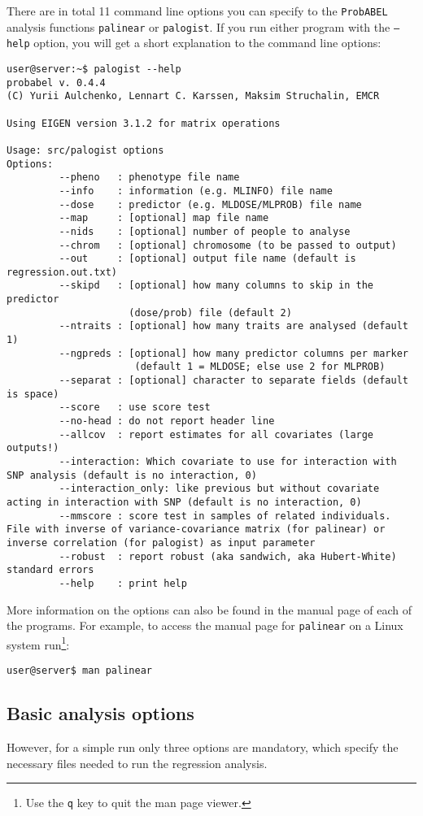 \documentclass[12pt,a4paper]{article}
\newcommand{\PA}{\texttt{ProbABEL}}
\begin{document}
There are in total 11 command line options you can specify to the
\PA{} analysis functions \texttt{palinear} or \texttt{palogist}. If
you run either program with the \texttt{--help} option, you will get a
short explanation to the command line options:
\begin{verbatim}
user@server:~$ palogist --help
probabel v. 0.4.4
(C) Yurii Aulchenko, Lennart C. Karssen, Maksim Struchalin, EMCR

Using EIGEN version 3.1.2 for matrix operations

Usage: src/palogist options
Options:
         --pheno   : phenotype file name
         --info    : information (e.g. MLINFO) file name
         --dose    : predictor (e.g. MLDOSE/MLPROB) file name
         --map     : [optional] map file name
         --nids    : [optional] number of people to analyse
         --chrom   : [optional] chromosome (to be passed to output)
         --out     : [optional] output file name (default is regression.out.txt)
         --skipd   : [optional] how many columns to skip in the predictor
                     (dose/prob) file (default 2)
         --ntraits : [optional] how many traits are analysed (default 1)
         --ngpreds : [optional] how many predictor columns per marker
                      (default 1 = MLDOSE; else use 2 for MLPROB)
         --separat : [optional] character to separate fields (default is space)
         --score   : use score test
         --no-head : do not report header line
         --allcov  : report estimates for all covariates (large outputs!)
         --interaction: Which covariate to use for interaction with SNP analysis (default is no interaction, 0)
         --interaction_only: like previous but without covariate acting in interaction with SNP (default is no interaction, 0)
         --mmscore : score test in samples of related individuals. File with inverse of variance-covariance matrix (for palinear) or inverse correlation (for palogist) as input parameter
         --robust  : report robust (aka sandwich, aka Hubert-White) standard errors
         --help    : print help
\end{verbatim}
More information on the options can also be found in the manual page
of each of the programs. For example, to access the manual page for
\texttt{palinear} on a Linux system run\footnote{Use the \texttt{q}
  key to quit the man page viewer.}:
\begin{verbatim}
user@server$ man palinear
\end{verbatim}


\subsection{Basic analysis options}
However, for a simple run only three options are mandatory, which
specify the necessary files needed to run the regression analysis.
\end{document}
